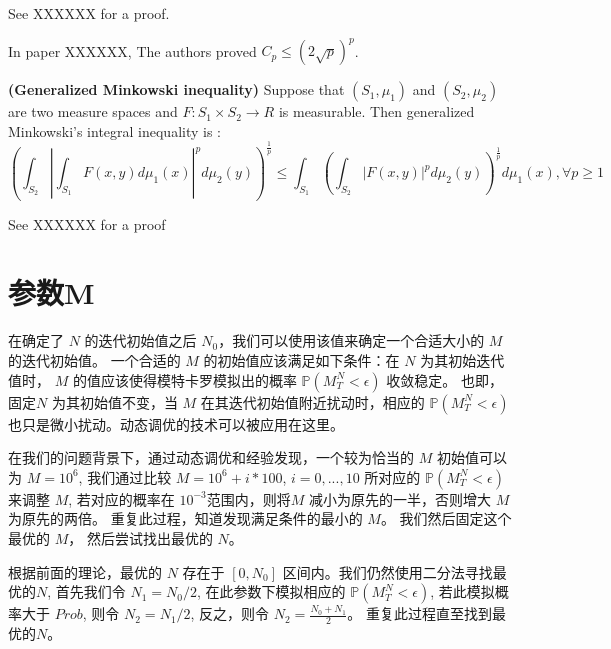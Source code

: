 See XXXXXX for a proof.

In paper XXXXXX, The authors proved $C_p\leq (2\sqrt{p})^p$.

\textbf{(Generalized Minkowski inequality)}
Suppose that $(S_1,\mu_1)$ and $(S_2,\mu_2)$ are two measure spaces and $F : S_1\times S_2\rightarrow R$ is measurable. Then generalized Minkowski's integral inequality is :
\begin{equation}
(\int_{S_2}|\int_{S_1}F(x,y)d\mu_1(x)|^pd\mu_2(y))^{\frac{1}{p}}\leq \int_{S_1}(\int_{S_2}|F(x,y)|^pd\mu_2(y))^{\frac{1}{p}}d\mu_1(x), \forall p\geq 1
\end{equation}

See XXXXXX for a proof



\section{参数M} %
\label{sec:M}
在确定了 $N$ 的迭代初始值之后 $N_0$，我们可以使用该值来确定一个合适大小的 $M$ 的迭代初始值。
一个合适的 $M$ 的初始值应该满足如下条件：在 $N$ 为其初始迭代值时， $M$ 的值应该使得模特卡罗模拟出的概率 $\mathbb{P}(M_T^N<\epsilon)$ 收敛稳定。
也即，固定$N$ 为其初始值不变，当 $M$ 在其迭代初始值附近扰动时，相应的 $\mathbb{P}(M_T^N<\epsilon)$ 也只是微小扰动。动态调优的技术可以被应用在这里。

在我们的问题背景下，通过动态调优和经验发现，一个较为恰当的 $M$ 初始值可以为 $M=10^6$, 我们通过比较 $M=10^6+i*100$, $i=0,...,10$ 
所对应的 $\mathbb{P}(M_T^N<\epsilon)$来调整 $M$, 若对应的概率在 $10^{-3}$范围内，则将$M$ 减小为原先的一半，否则增大 $M$ 为原先的两倍。
重复此过程，知道发现满足条件的最小的 $M$。 我们然后固定这个最优的 $M$， 然后尝试找出最优的 $N$。

根据前面的理论，最优的 $N$ 存在于 $[0, N_0]$ 区间内。我们仍然使用二分法寻找最优的$N$, 首先我们令 $N_1=N_0/2$, 在此参数下模拟相应的
$\mathbb{P}(M_T^N<\epsilon)$, 若此模拟概率大于 $Prob$, 则令 $N_2=N_1/2$, 反之，则令 $N_2=\frac{N_0+N_1}{2}$。
重复此过程直至找到最优的$N$。





